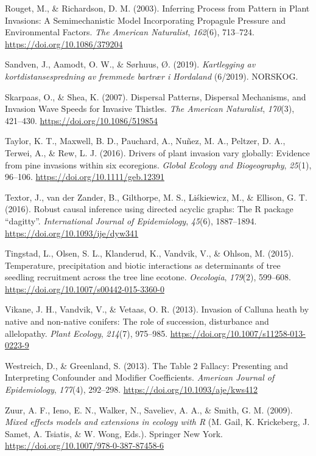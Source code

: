 \documentclass[
]{article}
\begin{document}
\leavevmode\hypertarget{ref-rougetInferringProcessPattern2003}{}%
Rouget, M., \& Richardson, D. M. (2003). Inferring Process from Pattern in Plant Invasions: A Semimechanistic Model Incorporating Propagule Pressure and Environmental Factors. \emph{The American Naturalist}, \emph{162}(6), 713--724. \url{https://doi.org/10.1086/379204}

\leavevmode\hypertarget{ref-sandvenKartleggingAvKortdistansespredning2019}{}%
Sandven, J., Aamodt, O. W., \& Sørhuus, Ø. (2019). \emph{Kartlegging av kortdistansespredning av fremmede bartrær i Hordaland} (6/2019). NORSKOG.

\leavevmode\hypertarget{ref-skarpaasDispersalPatternsDispersal2007}{}%
Skarpaas, O., \& Shea, K. (2007). Dispersal Patterns, Dispersal Mechanisms, and Invasion Wave Speeds for Invasive Thistles. \emph{The American Naturalist}, \emph{170}(3), 421--430. \url{https://doi.org/10.1086/519854}

\leavevmode\hypertarget{ref-taylorDriversPlantInvasion2016}{}%
Taylor, K. T., Maxwell, B. D., Pauchard, A., Nuñez, M. A., Peltzer, D. A., Terwei, A., \& Rew, L. J. (2016). Drivers of plant invasion vary globally: Evidence from pine invasions within six ecoregions. \emph{Global Ecology and Biogeography}, \emph{25}(1), 96--106. \url{https://doi.org/10.1111/geb.12391}

\leavevmode\hypertarget{ref-textorRobustCausalInference2016}{}%
Textor, J., van der Zander, B., Gilthorpe, M. S., Liśkiewicz, M., \& Ellison, G. T. (2016). Robust causal inference using directed acyclic graphs: The R package ``dagitty''. \emph{International Journal of Epidemiology}, \emph{45}(6), 1887--1894. \url{https://doi.org/10.1093/ije/dyw341}

\leavevmode\hypertarget{ref-tingstadTemperaturePrecipitationBiotic2015}{}%
Tingstad, L., Olsen, S. L., Klanderud, K., Vandvik, V., \& Ohlson, M. (2015). Temperature, precipitation and biotic interactions as determinants of tree seedling recruitment across the tree line ecotone. \emph{Oecologia}, \emph{179}(2), 599--608. \url{https://doi.org/10.1007/s00442-015-3360-0}

\leavevmode\hypertarget{ref-vikaneInvasionCallunaHeath2013}{}%
Vikane, J. H., Vandvik, V., \& Vetaas, O. R. (2013). Invasion of Calluna heath by native and non-native conifers: The role of succession, disturbance and allelopathy. \emph{Plant Ecology}, \emph{214}(7), 975--985. \url{https://doi.org/10.1007/s11258-013-0223-9}

\leavevmode\hypertarget{ref-westreichTableFallacyPresenting2013}{}%
Westreich, D., \& Greenland, S. (2013). The Table 2 Fallacy: Presenting and Interpreting Confounder and Modifier Coefficients. \emph{American Journal of Epidemiology}, \emph{177}(4), 292--298. \url{https://doi.org/10.1093/aje/kws412}

\leavevmode\hypertarget{ref-zuurMixedEffectsModels2009}{}%
Zuur, A. F., Ieno, E. N., Walker, N., Saveliev, A. A., \& Smith, G. M. (2009). \emph{Mixed effects models and extensions in ecology with R} (M. Gail, K. Krickeberg, J. Samet, A. Tsiatis, \& W. Wong, Eds.). Springer New York. \url{https://doi.org/10.1007/978-0-387-87458-6}
\end{document}
